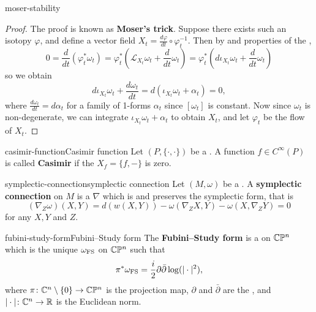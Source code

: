 \begin{example}{moser-stability}
    \begin{proof}
        The proof is known as \textbf{Moser's trick}. Suppose there exists such an isotopy $\varphi$, and define a vector field $X_t = \frac{d \varphi}{d t} \circ \varphi_t^{-1}$. Then by  and properties of the ,
        \[ 0 = \frac{d}{dt} \left(\varphi_t^* \omega_t\right) = \varphi_t^* \left(\mathcal{L}_{X_t} \omega_t + \frac{d}{dt} \omega_t \right) = \varphi_t^* \left(d \iota_{X_t} \omega_t + \frac{d}{dt} \omega_t \right) \]
        so we obtain
        \[ d \iota_{X_t} \omega_t + \frac{d \omega_t}{dt} = d(\iota_{X_t} \omega_t + \alpha_t) = 0 , \]
        where $\frac{d \omega_t}{d t} = d \alpha_t$ for a family of 1-forms $\alpha_t$ since $[\omega_t]$ is constant. Now since $\omega_t$ is non-degenerate, we can integrate $\iota_{X_t} \omega_t + \alpha_t$ to obtain $X_t$, and let $\varphi_t$ be the flow of $X_t$.
    \end{proof}
\end{example}

\begin{topic}{casimir-function}{Casimir function}
    Let $(P, \{ \cdot, \cdot \})$ be a . A function $f \in C^\infty(P)$ is called \textbf{Casimir} if the  $X_f = \{ f, - \}$ is zero.
\end{topic}

\begin{topic}{symplectic-connection}{symplectic connection}
    Let $(M, \omega)$ be a . A \textbf{symplectic connection} on $M$ is a  $\nabla$ which is  and preserves the symplectic form, that is
    \[ (\nabla_Z \omega)(X, Y) = d(w(X, Y)) - \omega(\nabla_Z X, Y) - \omega(X, \nabla_Z Y) = 0 \]
    for any  $X, Y$ and $Z$.
\end{topic}

\begin{topic}{fubini-study-form}{Fubini--Study form}
    The \textbf{Fubini--Study form} is a  on $\mathbb{C} \mathbb{P}^n$ which is the unique  $\omega_\textup{FS}$ on $\mathbb{C} \mathbb{P}^n$ such that
    \[ \pi^* \omega_\textup{FS} = \frac{i}{2} \partial \bar{\partial} \log (|\cdot|^2) , \]
    where $\pi \colon \mathbb{C}^n \setminus \{ 0 \} \to \mathbb{C} \mathbb{P}^n$ is the projection map, $\partial$ and $\bar{\partial}$ are the , and $|\cdot| \colon \mathbb{C}^n \to \mathbb{R}$ is the Euclidean norm.
\end{topic}

